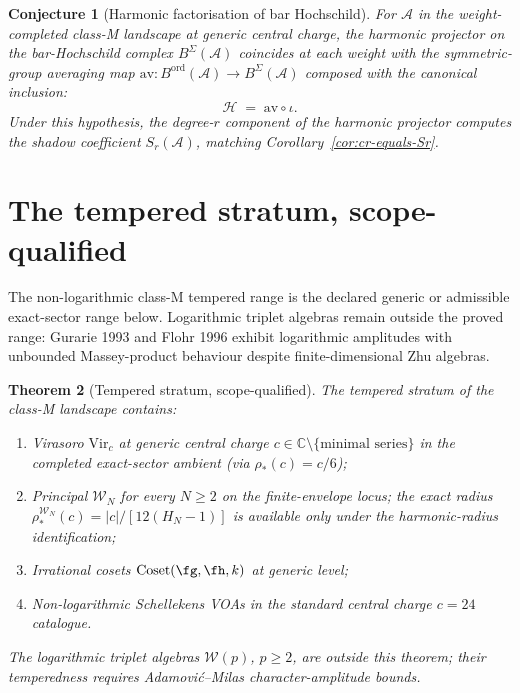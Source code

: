 \documentclass[11pt]{amsart}
\newtheorem{theorem}{Theorem}[section]
\newtheorem{conjecture}[theorem]{Conjecture}
\theoremstyle{definition}
\theoremstyle{remark}
\providecommand{\cA}{\mathcal{A}}
\providecommand{\cW}{\mathcal{W}}
\begin{document}
\begin{conjecture}[Harmonic factorisation of bar Hochschild]%
\label{prop:bar-hochschild-harmonic-factorization}%
For $\cA$ in the weight-completed class-M landscape at generic
central charge, the harmonic projector on the bar-Hochschild
complex $B^\Sigma(\cA)$ coincides at each weight with the
symmetric-group averaging map $\mathrm{av}\colon B^{\mathrm{ord}}(\cA)
\to B^\Sigma(\cA)$ composed with the canonical inclusion:
\[
  \mathcal{H} \;=\; \mathrm{av} \circ \iota.
\]
Under this hypothesis, the degree-$r$ component of the harmonic
projector computes the shadow coefficient $S_r(\cA)$, matching
Corollary~\ref{cor:cr-equals-Sr}.
\end{conjecture}

\section{The tempered stratum, scope-qualified}
\label{sec:tempered-stratum-scope}

The non-logarithmic class-M tempered range is the declared generic or
admissible exact-sector range below. Logarithmic triplet algebras
remain outside the proved range:
Gurarie 1993 and Flohr 1996 exhibit logarithmic amplitudes with
unbounded Massey-product behaviour despite finite-dimensional Zhu
algebras.

\begin{theorem}[Tempered stratum, scope-qualified]%
\label{thm:tempered-scope}%
The tempered stratum of the class-M landscape contains:
\begin{enumerate}[label=\textup{(\alph*)}]
\item Virasoro $\mathrm{Vir}_c$ at generic central charge
  $c \in \mathbb{C} \setminus \{\text{minimal series}\}$
  in the completed exact-sector ambient (via $\rho_*(c) = c/6$);
\item Principal $\cW_N$ for every $N \ge 2$ on the finite-envelope
  locus; the exact radius
  $\rho_*^{\cW_N}(c)=|c|/[12(H_N-1)]$ is available only under the
  harmonic-radius identification;
\item Irrational cosets \(\mathrm{Coset}(\fg, \fh, k)\) at generic
  level;
\item Non-logarithmic Schellekens VOAs in the standard central
  charge $c = 24$ catalogue.
\end{enumerate}
The logarithmic triplet algebras $\cW(p)$, $p \ge 2$, are outside
this theorem; their temperedness requires Adamovi\'c--Milas
character-amplitude bounds.
\end{theorem}
\end{document}
